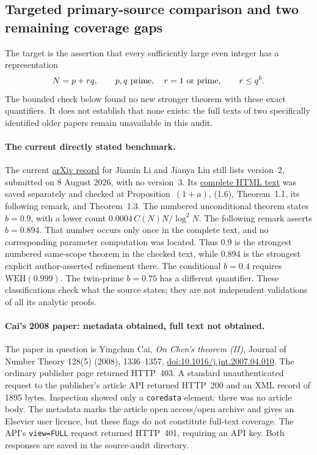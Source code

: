 \documentclass[11pt]{article}
\begin{document}
\subsection{Targeted primary-source comparison and two remaining coverage gaps}
\label{sec:frontier-primary-gap-review-20261008}

The target is the assertion that every sufficiently large even integer
has a representation
\[
 N=p+rq,\qquad p,q\ \hbox{prime},\quad
 r=1\ \hbox{or prime},\qquad r\le q^b.
\]
The bounded check below found no new stronger theorem with these exact
quantifiers. It does not establish that none exists: the full texts of
two specifically identified older papers remain unavailable in this audit.

\paragraph{The current directly stated benchmark.}
The current \href{https://arxiv.org/abs/2606.05224}{arXiv record}
for Jiamin Li and Jianya Liu still lists version~2, submitted on
8 August 2026, with no version~3. Its
\href{https://arxiv.org/html/2606.05224v2}{complete HTML text}
was saved separately and checked at Proposition~$(1+a)$, (1.6),
Theorem~1.1, its following remark, and Theorem~1.3.
The numbered unconditional theorem states \(b=0.9\), with a lower
count \(0.0004\,C(N)N/\log^2N\).
The following remark asserts \(b=0.894\).
That number occurs only once in the complete text, and no corresponding
parameter computation was located. Thus \(0.9\) is the strongest
numbered same-scope theorem in the checked text, while \(0.894\) is
the strongest explicit author-asserted refinement there.
The conditional \(b=0.4\) requires \(\mathrm{WEH}(0.999)\).
The twin-prime \(b=0.75\) has a different quantifier.
These classifications check what the source states; they are not
independent validations of all its analytic proofs.

\paragraph{Cai's 2008 paper: metadata obtained, full text not obtained.}
The paper in question is Yingchun Cai,
\emph{On Chen's theorem (II)}, Journal of Number Theory
128(5) (2008), 1336--1357,
\href{https://doi.org/10.1016/j.jnt.2007.04.010}
{doi:10.1016/j.jnt.2007.04.010}.
The ordinary publisher page returned HTTP~403.
A standard unauthenticated request to the publisher's article API
returned HTTP~200 and an XML record of 1895 bytes. Inspection showed
only a \texttt{coredata} element: there was no article body.
The metadata marks the article open access/open archive and gives
an Elsevier user licence, but these flags do not constitute full-text
coverage. The API's \texttt{view=FULL} request returned HTTP~401,
requiring an API key. Both responses are saved in the source-audit
directory.
\end{document}
